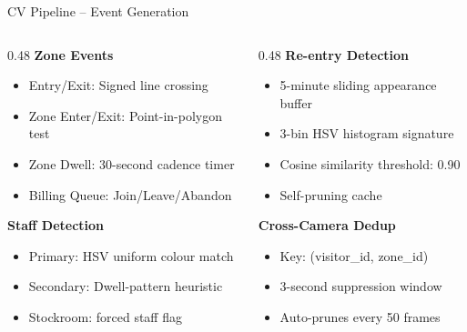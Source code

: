 \documentclass[aspectratio=169, 11pt]{beamer}
\begin{document}
\begin{frame}{CV Pipeline -- Event Generation}
  \begin{columns}[T]
    \begin{column}{0.48\textwidth}
      \textbf{Zone Events}
      \begin{itemize}
        \item Entry/Exit: Signed line crossing
        \item Zone Enter/Exit: Point-in-polygon test
        \item Zone Dwell: 30-second cadence timer
        \item Billing Queue: Join/Leave/Abandon
      \end{itemize}

      \vspace{0.3cm}
      \textbf{Staff Detection}
      \begin{itemize}
        \item Primary: HSV uniform colour match
        \item Secondary: Dwell-pattern heuristic
        \item Stockroom: forced staff flag
      \end{itemize}
    \end{column}
    \begin{column}{0.48\textwidth}
      \textbf{Re-entry Detection}
      \begin{itemize}
        \item 5-minute sliding appearance buffer
        \item 3-bin HSV histogram signature
        \item Cosine similarity threshold: 0.90
        \item Self-pruning cache
      \end{itemize}

      \vspace{0.3cm}
      \textbf{Cross-Camera Dedup}
      \begin{itemize}
        \item Key: (visitor\_id, zone\_id)
        \item 3-second suppression window
        \item Auto-prunes every 50 frames
      \end{itemize}
    \end{column}
  \end{columns}
\end{frame}

\end{document}
